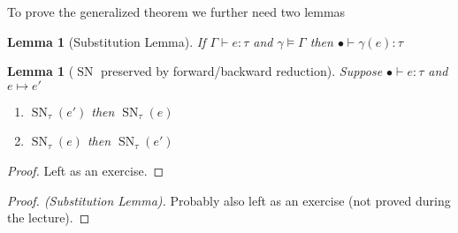 \documentclass[a4paper,10pt,fleqn]{article}
\DeclareMathOperator{\SNPred}{SN}
\newcommand{\evalto}{\ensuremath{\mapsto}}
\newcommand{\mtenv}{\ensuremath{\bullet}}
\newcommand{\SN}[2]{\ensuremath{\SNPred_{#1}(#2)}}
\newtheorem*{substlem}{Lemma}
\newtheorem*{forback}{Lemma}
\begin{document}
To prove the generalized theorem we further need two lemmas
\begin{substlem}[Substitution Lemma]
  If $\Gamma \vdash e : \tau$ and $\gamma \models \Gamma$ then $\mtenv \vdash \gamma (e) : \tau$
\end{substlem}
\begin{forback}[$\SNPred$ preserved by forward/backward reduction]
  Suppose $\mtenv \vdash e : \tau$ and $e \evalto e'$
  \begin{enumerate}
  \item $\SN{\tau}{e'}$ then $\SN{\tau}{e}$
  \item $\SN{\tau}{e}$ then $\SN{\tau}{e'}$
  \end{enumerate}
\end{forback}
\begin{proof}
  Left as an exercise.
\end{proof}
\begin{proof}[Proof. (Substitution Lemma)] 
  Probably also left as an exercise (not proved during the lecture).
\end{proof}
\end{document}
